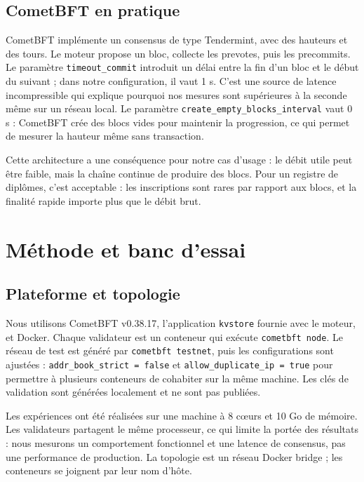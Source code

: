 \documentclass[conference]{IEEEtran}
\begin{document}
\subsection{CometBFT en pratique}

CometBFT implémente un consensus de type Tendermint, avec des hauteurs et des tours. Le moteur propose un bloc, collecte les prevotes, puis les precommits. Le paramètre \texttt{timeout\_commit} introduit un délai entre la fin d'un bloc et le début du suivant ; dans notre configuration, il vaut 1 s. C'est une source de latence incompressible qui explique pourquoi nos mesures sont supérieures à la seconde même sur un réseau local. Le paramètre \texttt{create\_empty\_blocks\_interval} vaut 0 s : CometBFT crée des blocs vides pour maintenir la progression, ce qui permet de mesurer la hauteur même sans transaction.

Cette architecture a une conséquence pour notre cas d'usage : le débit utile peut être faible, mais la chaîne continue de produire des blocs. Pour un registre de diplômes, c'est acceptable : les inscriptions sont rares par rapport aux blocs, et la finalité rapide importe plus que le débit brut.

\section{Méthode et banc d'essai}
\label{sec:methode}

\subsection{Plateforme et topologie}

Nous utilisons CometBFT v0.38.17, l'application \texttt{kvstore} fournie avec le moteur, et Docker. Chaque validateur est un conteneur qui exécute \texttt{cometbft node}. Le réseau de test est généré par \texttt{cometbft testnet}, puis les configurations sont ajustées : \texttt{addr\_book\_strict = false} et \texttt{allow\_duplicate\_ip = true} pour permettre à plusieurs conteneurs de cohabiter sur la même machine. Les clés de validation sont générées localement et ne sont pas publiées.

Les expériences ont été réalisées sur une machine à 8 cœurs et 10 Go de mémoire. Les validateurs partagent le même processeur, ce qui limite la portée des résultats : nous mesurons un comportement fonctionnel et une latence de consensus, pas une performance de production. La topologie est un réseau Docker bridge ; les conteneurs se joignent par leur nom d'hôte.
\end{document}

